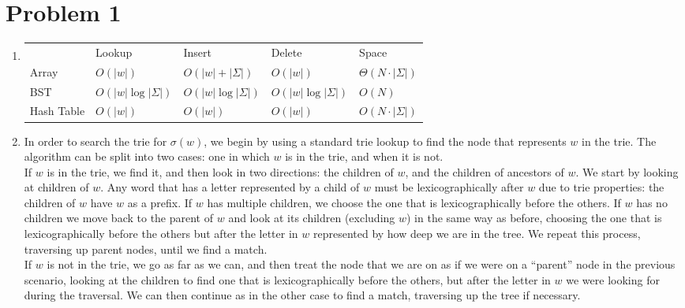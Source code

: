 \documentclass{article}
\theoremstyle{casestyle}
\begin{document}
\section *{Problem 1}
\begin{enumerate}[i]
\item    \begin{tabular}{lllll}
      \cline{2-5}
            & Lookup & Insert & Delete & Space \\ \cline{2-5} 
           Array      & $O(\left|w\right|)$      & $O(\left|w\right| + \left|\Sigma\right|)$      & $O(\left| w\right|)$      & $\Theta(N\cdot\left|\Sigma\right|)$     \\
           BST        & $O(\left|w\right| \log {\left| \Sigma \right|})$      & $O(\left|w\right| \log {\left| \Sigma \right|})$  & $O(\left|w\right| \log {\left| \Sigma \right|})$   & $O(N)$     \\
           Hash Table & $O(\left|w\right|)$      & $O(\left|w\right|)$      & $O(\left|w\right|)$      &     $O(N\cdot\left|\Sigma\right|)$
    \end{tabular}
  
  \item In order to search the trie for $\sigma(w)$, we begin by using a standard trie lookup to find the node that represents $w$ in the trie. The algorithm can be split into two cases: one in which $w$ is in the trie, and when it is not.\\

If $w$ is in the trie, we find it, and then look in two directions: the children of $w$, and the children of ancestors of $w$. We start by looking at children of $w$. Any word that has a letter represented by a child of $w$ must be lexicographically after $w$ due to trie properties: the children of $w$ have $w$ as a prefix. If $w$ has multiple children, we choose the one that is lexicographically before the others. If $w$ has no children we move back to the parent of $w$ and look at its children (excluding $w$) in the same way as before, choosing the one that is lexicographically before the others but after the letter in $w$ represented by how deep we are in the tree. We repeat this process, traversing up parent nodes, until we find a match. \\

If $w$ is not in the trie, we go as far as we can, and then treat the node that we are on as if we were on a ``parent'' node in the previous scenario, looking at the children to find one that is lexicographically before the others, but after the letter in $w$ we were looking for during the traversal. We can then continue as in the other case to find a match, traversing up the tree if necessary. \\


\end{enumerate}
\end{document}
